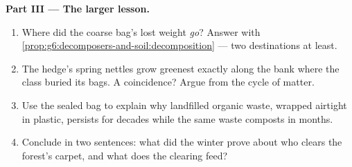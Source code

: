 \begin{problem}
\medskip\noindent\textbf{Part III --- The larger lesson.}
\begin{enumerate}[resume]
  \item Where did the coarse bag's lost weight \emph{go}?
        Answer with
        \cref{prop:g6:decomposers-and-soil:decomposition}
        --- two destinations at least.
  \item The hedge's spring nettles grow greenest exactly
        along the bank where the class buried its bags. A
        coincidence? Argue from the cycle of matter.
  \item Use the sealed bag to explain why landfilled
        organic waste, wrapped airtight in plastic,
        persists for decades while the same waste composts
        in months.
  \item Conclude in two sentences: what did the winter
        prove about who clears the forest's carpet, and
        what does the clearing feed?
\end{enumerate}
\end{problem}
